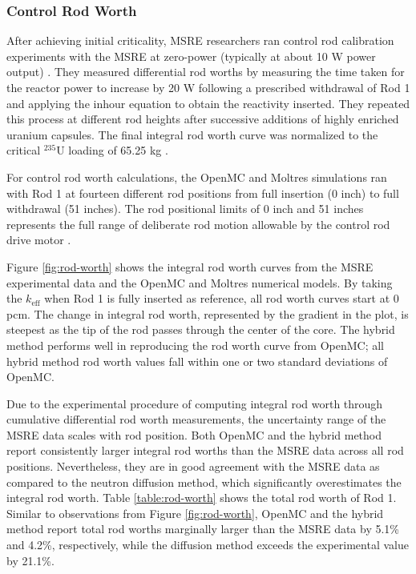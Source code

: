 \subsubsection{Control Rod Worth}

After achieving initial criticality, \gls{MSRE} researchers ran control rod calibration experiments
with the \gls{MSRE} at zero-power (typically at about 10 W power output)
\cite{prince_zero-power_1968}. They measured differential rod worths by measuring the time taken
for the reactor power to increase by 20 W following a prescribed withdrawal of Rod 1 and applying
the inhour equation to obtain the reactivity inserted. They repeated this process at different rod
heights after successive additions of highly enriched uranium capsules. The final integral rod
worth curve was normalized to the critical $^{235}$U loading of 65.25 kg
\cite{prince_zero-power_1968}.

For control rod worth calculations, the OpenMC and Moltres simulations ran with Rod 1 at fourteen
different rod positions from full insertion (0 inch) to full withdrawal (51 inches). The rod
positional limits of 0 inch and 51 inches represents the full range of deliberate rod motion
allowable by the control rod drive motor \cite{robertson_msre_1965}.

Figure \ref{fig:rod-worth} shows the integral rod worth curves from the \gls{MSRE} experimental
data and the OpenMC and Moltres numerical models. By taking the $k_\text{eff}$ when Rod 1 is fully
inserted as reference, all rod worth curves start at 0 pcm. The change in integral rod worth,
represented by the gradient in the plot, is steepest as the tip of the rod passes through the
center of the core. The hybrid method performs well in reproducing the rod worth curve from OpenMC;
all hybrid method rod worth values fall within one or two standard deviations of OpenMC.

Due to the experimental procedure of computing integral rod worth through cumulative differential
rod worth measurements, the uncertainty range of the \gls{MSRE} data scales with rod position.
Both OpenMC and the hybrid method report consistently larger integral rod worths than the
\gls{MSRE} data across all rod positions. Nevertheless, they are in good agreement with the
\gls{MSRE} data as compared to the neutron diffusion method, which significantly overestimates the
integral rod worth.
Table \ref{table:rod-worth} shows the total rod worth of Rod 1. Similar to observations from Figure
\ref{fig:rod-worth}, OpenMC and the hybrid method report total rod worths marginally larger than
the \gls{MSRE} data by 5.1\% and 4.2\%, respectively, while the diffusion method exceeds the
experimental value by 21.1\%.

